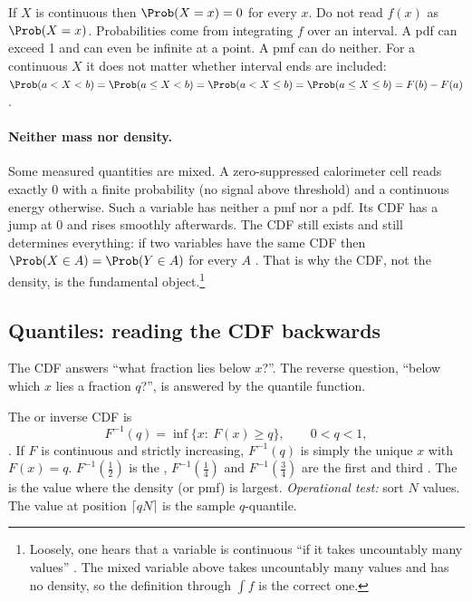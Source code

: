 \begin{pitfall}
If $X$ is continuous then $\Prob(X=x)=0$ for every $x$. Do not read $f(x)$ as
$\Prob(X=x)$. Probabilities come from integrating $f$ over an interval. A pdf
can exceed 1 and can even be infinite at a point. A pmf can do neither. For a
continuous $X$ it does not matter whether interval ends are included:
$\Prob(a<X<b)=\Prob(a\le X<b)=\Prob(a<X\le b)=\Prob(a\le X\le b)=F(b)-F(a)$.
\end{pitfall}

\paragraph{Neither mass nor density.} Some measured quantities are mixed. A
zero-suppressed calorimeter cell reads exactly $0$ with a finite probability
(no signal above threshold) and a continuous energy otherwise. Such a
variable has neither a pmf nor a pdf. Its CDF has a jump at 0 and rises
smoothly afterwards. The CDF still exists and still determines everything: if
two variables have the same CDF then $\Prob(X\in A)=\Prob(Y\in A)$ for every
$A$ . That is why the CDF, not the density, is the
fundamental object.\footnote{Loosely, one hears that a variable is continuous
``if it takes uncountably many values'' . The
mixed variable above takes uncountably many values and has no density, so the
definition through $\int f$ is the correct one.}

\subsection{Quantiles: reading the CDF backwards}

The CDF answers ``what fraction lies below $x$?''. The reverse question,
``below which $x$ lies a fraction $q$?'', is answered by the quantile function.

\begin{workdef}
The  or inverse CDF is
\[
  F^{-1}(q)=\inf\{x:\ F(x)\ge q\},\qquad 0<q<1 ,
\]
. If $F$ is
continuous and strictly increasing, $F^{-1}(q)$ is simply the unique $x$ with
$F(x)=q$. $F^{-1}(\tfrac12)$ is the , $F^{-1}(\tfrac14)$ and
$F^{-1}(\tfrac34)$ are the first and third .
The  is the value where the density (or pmf) is largest.
\emph{Operational test:} sort $N$ values. The value at position $\lceil qN\rceil$
is the sample $q$-quantile.
\end{workdef}

